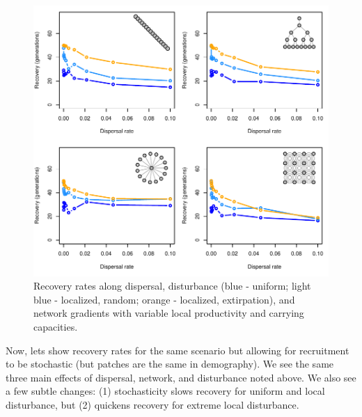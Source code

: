 \documentclass[]{article}
\begin{document}
\begin{figure}[H]

{\centering \includegraphics{Managing_for_ecological_surprises_in_metapopulations_makeHTML_files/figure-latex/results for variables patches-1} 

}

\caption{Recovery rates along dispersal, disturbance (blue - uniform; light blue - localized, random; orange - localized, extirpation), and network gradients with variable local productivity and carrying capacities.}\label{fig:results for variables patches}
\end{figure}

 Now, lets show recovery rates for the same scenario but allowing for
recruitment to be stochastic (but patches are the same in demography).
We see the same three main effects of dispersal, network, and
disturbance noted above. We also see a few subtle changes: (1)
stochasticity slows recovery for uniform and local disturbance, but (2)
quickens recovery for extreme local disturbance.
\end{document}

